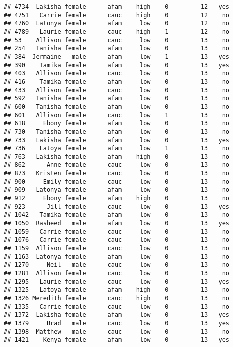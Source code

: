 \documentclass[
]{article}
\begin{document}
\begin{verbatim}
## 4734  Lakisha female      afam    high    0         12   yes
## 4751   Carrie female      cauc    high    0         12    no
## 4760  Latonya female      afam     low    0         12    no
## 4789   Laurie female      cauc    high    1         12    no
## 53    Allison female      cauc     low    0         13    no
## 254   Tanisha female      afam     low    0         13    no
## 384  Jermaine   male      afam     low    1         13   yes
## 390    Tamika female      afam     low    0         13   yes
## 403   Allison female      cauc     low    0         13    no
## 416    Tamika female      afam     low    0         13    no
## 433   Allison female      cauc     low    0         13    no
## 592   Tanisha female      afam     low    0         13    no
## 600   Tanisha female      afam     low    0         13    no
## 601   Allison female      cauc     low    1         13    no
## 618     Ebony female      afam     low    0         13    no
## 730   Tanisha female      afam     low    0         13    no
## 733   Lakisha female      afam     low    0         13   yes
## 736    Latoya female      afam     low    1         13    no
## 763   Lakisha female      afam    high    0         13    no
## 862      Anne female      cauc     low    0         13    no
## 873   Kristen female      cauc     low    0         13    no
## 900     Emily female      cauc     low    0         13    no
## 909   Latonya female      afam     low    0         13    no
## 912     Ebony female      afam    high    0         13    no
## 923      Jill female      cauc     low    0         13   yes
## 1042   Tamika female      afam     low    0         13    no
## 1050  Rasheed   male      afam     low    0         13   yes
## 1059   Carrie female      cauc     low    0         13    no
## 1076   Carrie female      cauc     low    0         13    no
## 1159  Allison female      cauc     low    0         13    no
## 1163  Latonya female      afam     low    0         13    no
## 1270     Neil   male      cauc     low    0         13    no
## 1281  Allison female      cauc     low    0         13    no
## 1295   Laurie female      cauc     low    0         13   yes
## 1325   Latoya female      afam    high    0         13    no
## 1326 Meredith female      cauc    high    0         13    no
## 1335   Carrie female      cauc     low    0         13    no
## 1372  Lakisha female      afam     low    0         13   yes
## 1379     Brad   male      cauc     low    0         13   yes
## 1398  Matthew   male      cauc     low    0         13    no
## 1421    Kenya female      afam     low    0         13   yes

\end{verbatim}
\end{document}
